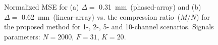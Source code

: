 \documentclass[journal]{IEEEtran}
\theoremstyle{definition}
\begin{document}
\begin{figure}[htb]
	\hfill%
	\hfill%
	\hfill%
	\caption{Normalized MSE for (a) $\Delta = $ \SI{0.31}{\milli\metre}~(phased-array) and (b) $\Delta = $ \SI{0.62}{\milli\metre}~(linear-array) vs. the compression ratio~($M/N$) for the proposed method for \num{1}-, \num{2}-, \num{5}- and \num{10}-channel scenarios. Signals parameters: $N=2000$, $F=31$, $K=20$.}
	\label{fig_synth_US}
\end{figure}
\end{document}
